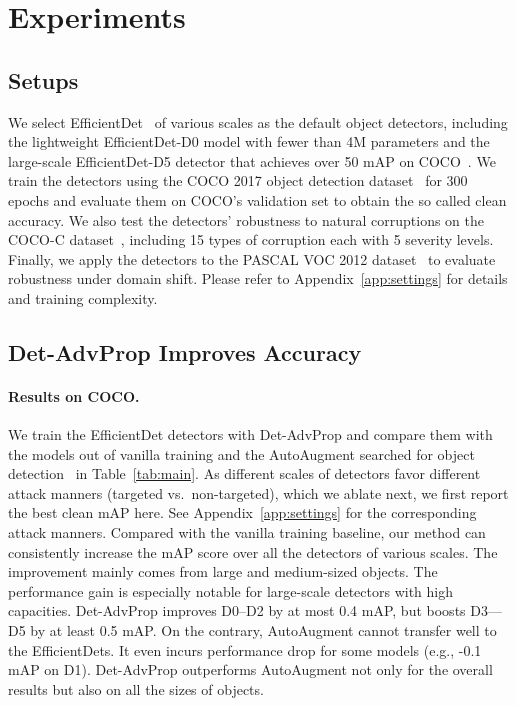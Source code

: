 \documentclass[final]{cvpr}
\begin{document}
\section{Experiments}


\subsection{Setups}
We select EfficientDet~\cite{tan2020edet} of various scales as the default object detectors, including the lightweight EfficientDet-D0 model with fewer than 4M parameters and the large-scale EfficientDet-D5 detector that achieves over 50 mAP on COCO~\cite{lin2015coco}.
We train the detectors using the COCO 2017 object detection dataset~\cite{lin2015coco} for 300 epochs and evaluate them on COCO's validation set to obtain the so called clean accuracy. We also test the detectors' robustness to natural corruptions on the COCO-C dataset~\cite{michaelis2020benchmarking}, including 15 types of corruption each with 5 severity levels. Finally, we apply the detectors to the PASCAL VOC 2012 dataset~\cite{pascal-voc-2012} to evaluate robustness under domain shift. Please refer to Appendix~\ref{app:settings} for details and training complexity.


\subsection{Det-AdvProp Improves Accuracy}
\label{sec:acc}
\paragraph{Results on COCO.}
We train the EfficientDet detectors with Det-AdvProp and compare them with the models out of vanilla training and the AutoAugment searched for object detection~\cite{zoph2019learning} in Table~\ref{tab:main}.
As different scales of detectors favor different attack manners (targeted vs.\ non-targeted), which we ablate next, we first report the best clean mAP here. See Appendix~\ref{app:settings} for the corresponding attack manners. 
Compared with the vanilla training baseline, our method can consistently increase the mAP score over all the detectors of various scales. The improvement mainly comes from large and medium-sized objects.
The performance gain is especially notable for large-scale detectors with high capacities. Det-AdvProp improves D0--D2 by at most 0.4 mAP, but boosts D3---D5 by at least 0.5 mAP. 
On the contrary, AutoAugment cannot transfer well to the EfficientDets.
It even incurs performance drop for some models (e.g., -0.1 mAP on D1).
Det-AdvProp outperforms AutoAugment not only for the overall results but also on all the sizes of objects.
\end{document}
